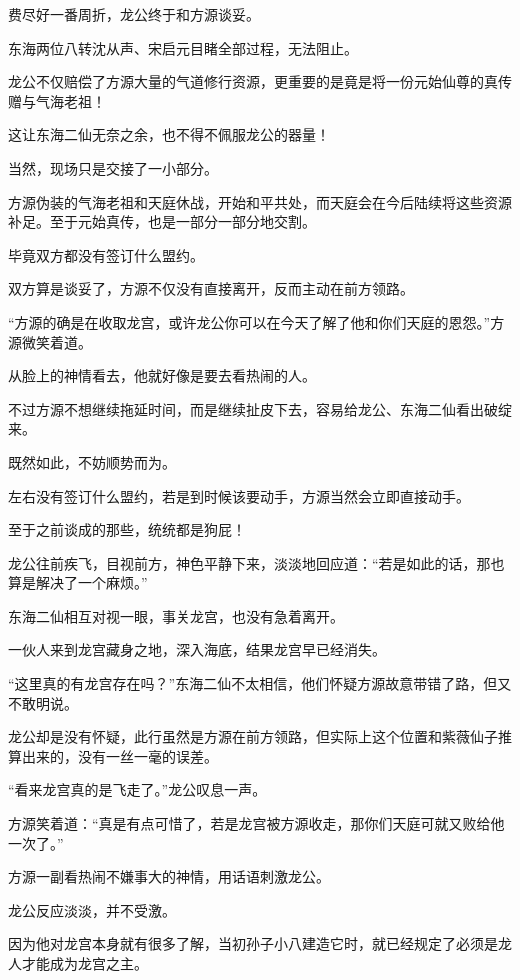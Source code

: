 
\begin{this_body}

费尽好一番周折，龙公终于和方源谈妥。

东海两位八转沈从声、宋启元目睹全部过程，无法阻止。

龙公不仅赔偿了方源大量的气道修行资源，更重要的是竟是将一份元始仙尊的真传赠与气海老祖！

这让东海二仙无奈之余，也不得不佩服龙公的器量！

当然，现场只是交接了一小部分。

方源伪装的气海老祖和天庭休战，开始和平共处，而天庭会在今后陆续将这些资源补足。至于元始真传，也是一部分一部分地交割。

毕竟双方都没有签订什么盟约。

双方算是谈妥了，方源不仅没有直接离开，反而主动在前方领路。

“方源的确是在收取龙宫，或许龙公你可以在今天了解了他和你们天庭的恩怨。”方源微笑着道。

从脸上的神情看去，他就好像是要去看热闹的人。

不过方源不想继续拖延时间，而是继续扯皮下去，容易给龙公、东海二仙看出破绽来。

既然如此，不妨顺势而为。

左右没有签订什么盟约，若是到时候该要动手，方源当然会立即直接动手。

至于之前谈成的那些，统统都是狗屁！

龙公往前疾飞，目视前方，神色平静下来，淡淡地回应道：“若是如此的话，那也算是解决了一个麻烦。”

东海二仙相互对视一眼，事关龙宫，也没有急着离开。

一伙人来到龙宫藏身之地，深入海底，结果龙宫早已经消失。

“这里真的有龙宫存在吗？”东海二仙不太相信，他们怀疑方源故意带错了路，但又不敢明说。

龙公却是没有怀疑，此行虽然是方源在前方领路，但实际上这个位置和紫薇仙子推算出来的，没有一丝一毫的误差。

“看来龙宫真的是飞走了。”龙公叹息一声。

方源笑着道：“真是有点可惜了，若是龙宫被方源收走，那你们天庭可就又败给他一次了。”

方源一副看热闹不嫌事大的神情，用话语刺激龙公。

龙公反应淡淡，并不受激。

因为他对龙宫本身就有很多了解，当初孙子小八建造它时，就已经规定了必须是龙人才能成为龙宫之主。


\end{this_body}
